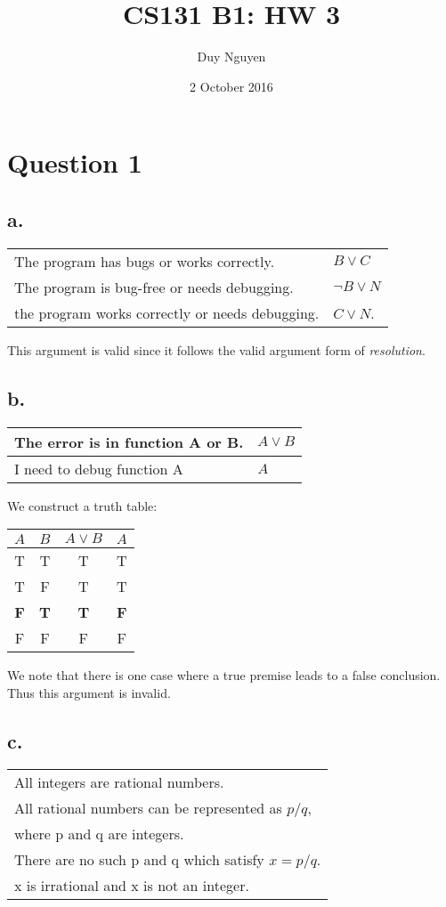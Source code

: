 \documentclass{article}
\title{CS131 B1: HW 3}
\author{Duy Nguyen}
\date{2 October 2016}
\begin{document}
\maketitle

\section*{Question 1}
\subsection*{a.}
\begin{tabular}{l|l}
    The program has bugs or works correctly. & $B \lor C$ \\
    The program is bug-free or needs debugging. & $\neg B \lor N$ \\ \hline
    the program works correctly or needs debugging.&$C \lor N$.
\end{tabular}

This argument is valid since it follows the valid argument form of \textit{resolution}. 
\subsection*{b.}
\begin{tabular}{l|l}
    The error is in function A or B. & $A \lor B$ \\ \hline
    I need to debug function A & $A$
\end{tabular}

We construct a truth table:

\begin{tabular}{cc|cc}
    $A$&$B$&$A \lor B$&$A$ \\ \hline
    T&T&T&T\\
    T&F&T&T\\
    \textbf{F}&\textbf{T}&\textbf{T}&\textbf{F}\\
    F&F&F&F
\end{tabular}

We note that there is one case where a true premise leads to a false conclusion. Thus this argument is invalid. 

\subsection*{c.}
\begin{tabular}{l}
    All integers are rational numbers. \\
    All rational numbers can be represented as $p/q$, \\
    where
p and q are integers. \\ 
    There are no such p and q which satisfy $x=p/q$. \\ \hline
    x is irrational and x is not an integer.
\end{tabular}
\end{document}
